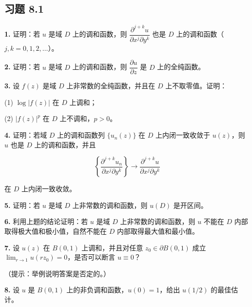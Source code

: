 \documentclass[11pt,a4paper]{article}
\begin{document}
\subsection{习题 8.1}\label{ch08-practice-heading-2}

\par{}
\noindent\textbf{1.} 证明：若 \(u\) 是域 \(D\) 上的调和函数，则
\(\dfrac{\partial^{j+k}u}{\partial x^j\partial y^k}\) 也是 \(D\)
上的调和函数（\(j,k=0,1,2,\ldots\)）。

\par{}
\noindent\textbf{2.} 证明：若 \(u\) 是域 \(D\) 上的调和函数，则
\(\dfrac{\partial u}{\partial z}\) 是 \(D\) 上的全纯函数。

\par{}
\noindent\textbf{3.} 设 \(f(z)\) 是域 \(D\) 上非常数的全纯函数，并且在 \(D\)
上不取零值。证明：

(1) \(\log|f(z)|\) 在 \(D\) 上调和；

(2) \(|f(z)|^p\) 在 \(D\) 上不调和，\(p>0\)。

\par{}
\noindent\textbf{4.} 证明：若域 \(D\) 上的调和函数列 \(\{u_n(z)\}\) 在 \(D\)
上内闭一致收敛于 \(u(z)\)，则 \(u\) 也是 \(D\) 上的调和函数，并且

\[
\left\{\frac{\partial^{j+k}u_n}{\partial x^j\partial y^k}\right\}
\longrightarrow\frac{\partial^{j+k}u}{\partial x^j\partial y^k}
\]

在 \(D\) 上内闭一致收敛。

\par{}
\noindent\textbf{5.} 证明：若 \(u\) 是域 \(D\) 上非常数的调和函数，则 \(u(D)\)
是开区间。

\par{}
\noindent\textbf{6.} 利用上题的结论证明：若 \(u\) 是域 \(D\)
上非常数的调和函数，则 \(u\) 不能在 \(D\)
内部取得极大值和极小值，自然不能在 \(D\) 内部取得最大值和最小值。

\par{}
\noindent\textbf{7.} 设 \(u(z)\) 在 \(B(0,1)\) 上调和，并且对任意
\(z_0\in\partial B(0,1)\) 成立 \(\lim_{r\to1}u(rz_0)=0\)，是否可以断言
\(u\equiv0\)？

（提示：举例说明答案是否定的。）

\par{}
\noindent\textbf{8.} 设 \(u\) 是 \(B(0,1)\) 上的非负调和函数，\(u(0)=1\)，给出
\(u(1/2)\) 的最佳估计。
\end{document}
